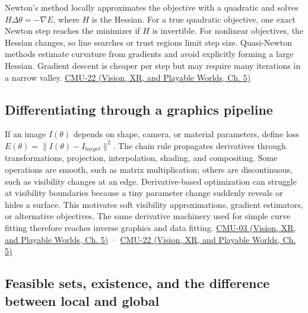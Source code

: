 Newton's method locally approximates the objective with a quadratic and solves \(H\Delta\theta=-\nabla E\), where \(H\) is the Hessian. For a true quadratic objective, one exact Newton step reaches the minimizer if \(H\) is invertible. For nonlinear objectives, the Hessian changes, so line searches or trust regions limit step size. Quasi-Newton methods estimate curvature from gradients and avoid explicitly forming a large Hessian. Gradient descent is cheaper per step but may require many iterations in a narrow valley. \href{../07-Vision-XR-and-Playable-Worlds/main.pdf\#nameddest=04-visual-computing-ii-ch036-cmu-22---optimization}{CMU-22 (Vision, XR, and Playable Worlds, Ch. 5)}

\subsection{Differentiating through a graphics pipeline}\label{04-visual-computing-ii-ch029-differentiating-through-a-graphics-pipeline}

\hypertarget{04-visual-computing-ii-ch029-differentiating-through-a-graphics-pipeline}{}

If an image \(I(\theta)\) depends on shape, camera, or material parameters, define loss \(E(\theta)=\|I(\theta)-I_{target}\|^2\). The chain rule propagates derivatives through transformations, projection, interpolation, shading, and compositing. Some operations are smooth, such as matrix multiplication; others are discontinuous, such as visibility changes at an edge. Derivative-based optimization can struggle at visibility boundaries because a tiny parameter change suddenly reveals or hides a surface. This motivates soft visibility approximations, gradient estimators, or alternative objectives. The same derivative machinery used for simple curve fitting therefore reaches inverse graphics and data fitting. \href{../07-Vision-XR-and-Playable-Worlds/main.pdf\#nameddest=04-visual-computing-ii-ch036-cmu-03---vector-calculus-preview}{CMU-03 (Vision, XR, and Playable Worlds, Ch. 5)} · \href{../07-Vision-XR-and-Playable-Worlds/main.pdf\#nameddest=04-visual-computing-ii-ch036-cmu-22---optimization}{CMU-22 (Vision, XR, and Playable Worlds, Ch. 5)}

\subsection{Feasible sets, existence, and the difference between local and global}\label{04-visual-computing-ii-ch029-feasible-sets-existence-and-the-difference-between-local-and-global}

